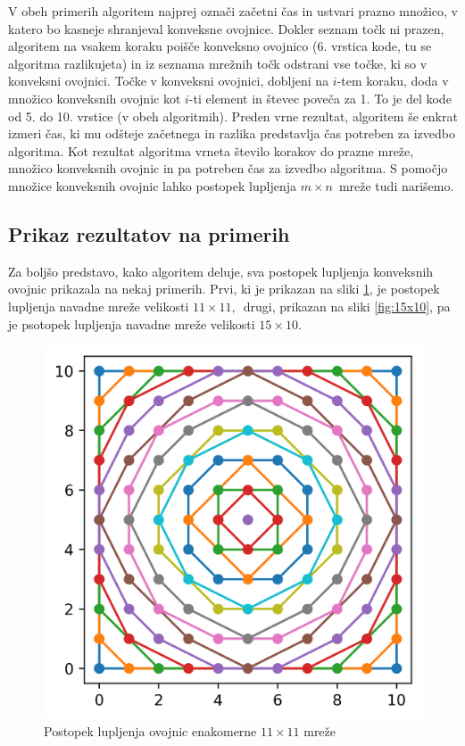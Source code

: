 \documentclass[a4paper]{article}
\begin{document}
V obeh primerih algoritem najprej označi začetni čas in ustvari prazno množico, v katero bo kasneje shranjeval konveksne ovojnice. Dokler seznam točk ni prazen, algoritem na vsakem koraku 
poišče konveksno ovojnico (6. vrstica kode, tu se algoritma razlikujeta) in iz seznama mrežnih točk odstrani vse točke, ki so v konveksni ovojnici. Točke v konveksni ovojnici, dobljeni na 
$i$-tem koraku, doda v množico konveksnih ovojnic kot $i$-ti element in števec poveča za 1. To je del kode od 5. do 10. vrstice (v obeh algoritmih). Preden vrne rezultat, algoritem še enkrat 
izmeri čas, ki mu odšteje začetnega in razlika predstavlja čas potreben za izvedbo algoritma. Kot rezultat algoritma vrneta število korakov do prazne mreže, množico konveksnih ovojnic in pa 
potreben čas za izvedbo algoritma. S pomočjo množice konveksnih ovojnic lahko postopek lupljenja $m \times n$~mreže tudi narišemo.

\subsection{Prikaz rezultatov na primerih}
Za boljšo predstavo, kako algoritem deluje, sva postopek lupljenja konveksnih ovojnic prikazala na nekaj primerih. Prvi, ki je prikazan na sliki \ref{fig:11x11}, je postopek lupljenja 
navadne mreže velikosti $11 \times 11,$~drugi, prikazan na sliki \ref{fig:15x10}, pa je psotopek lupljenja navadne mreže velikosti $15 \times 10$. 

\begin{figure}[!h]
	\centering
	\caption{Postopek lupljenja ovojnic enakomerne $11 \times 11$ mreže}
	\label{fig:11x11}
	\includegraphics[scale=0.6]{slike/11x11_enakomerna.png}
\end{figure}
\end{document}
